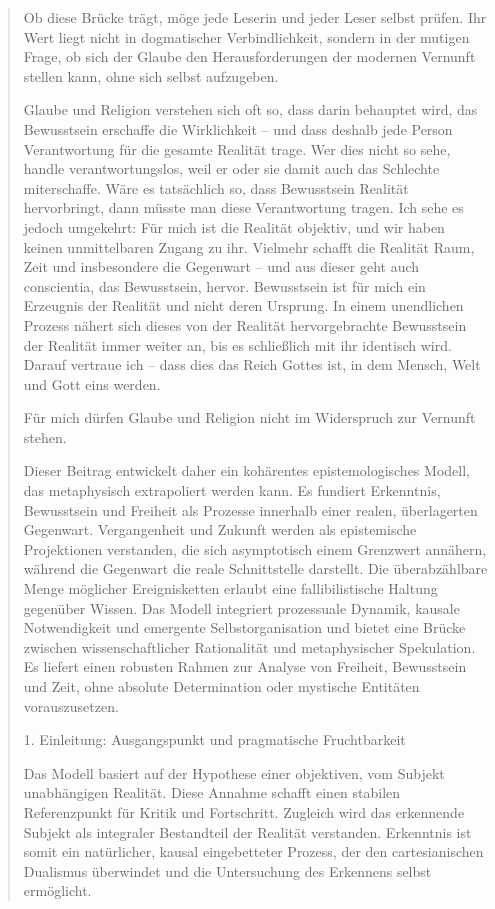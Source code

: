 \documentclass[
  ngerman,
]{article}
\begin{document}
\begin{quote}
Ob diese Brücke trägt, möge jede Leserin und jeder Leser selbst prüfen.
Ihr Wert liegt nicht in dogmatischer Verbindlichkeit, sondern in der
mutigen Frage, ob sich der Glaube den Herausforderungen der modernen
Vernunft stellen kann, ohne sich selbst aufzugeben.

Glaube und Religion verstehen sich oft so, dass darin behauptet wird,
das Bewusstsein erschaffe die Wirklichkeit -- und dass deshalb jede
Person Verantwortung für die gesamte Realität trage. Wer dies nicht so
sehe, handle verantwortungslos, weil er oder sie damit auch das
Schlechte miterschaffe. Wäre es tatsächlich so, dass Bewusstsein
Realität hervorbringt, dann müsste man diese Verantwortung tragen. Ich
sehe es jedoch umgekehrt: Für mich ist die Realität objektiv, und wir
haben keinen unmittelbaren Zugang zu ihr. Vielmehr schafft die Realität
Raum, Zeit und insbesondere die Gegenwart -- und aus dieser geht auch
conscientia, das Bewusstsein, hervor. Bewusstsein ist für mich ein
Erzeugnis der Realität und nicht deren Ursprung. In einem unendlichen
Prozess nähert sich dieses von der Realität hervorgebrachte Bewusstsein
der Realität immer weiter an, bis es schließlich mit ihr identisch wird.
Darauf vertraue ich -- dass dies das Reich Gottes ist, in dem Mensch,
Welt und Gott eins werden.

Für mich dürfen Glaube und Religion nicht im Widerspruch zur Vernunft
stehen.

Dieser Beitrag entwickelt daher ein kohärentes epistemologisches Modell,
das metaphysisch extrapoliert werden kann. Es fundiert Erkenntnis,
Bewusstsein und Freiheit als Prozesse innerhalb einer realen,
überlagerten Gegenwart. Vergangenheit und Zukunft werden als
epistemische Projektionen verstanden, die sich asymptotisch einem
Grenzwert annähern, während die Gegenwart die reale Schnittstelle
darstellt. Die überabzählbare Menge möglicher Ereignisketten erlaubt
eine fallibilistische Haltung gegenüber Wissen. Das Modell integriert
prozessuale Dynamik, kausale Notwendigkeit und emergente
Selbstorganisation und bietet eine Brücke zwischen wissenschaftlicher
Rationalität und metaphysischer Spekulation. Es liefert einen robusten
Rahmen zur Analyse von Freiheit, Bewusstsein und Zeit, ohne absolute
Determination oder mystische Entitäten vorauszusetzen.

1. Einleitung: Ausgangspunkt und pragmatische Fruchtbarkeit

Das Modell basiert auf der Hypothese einer objektiven, vom Subjekt
unabhängigen Realität. Diese Annahme schafft einen stabilen
Referenzpunkt für Kritik und Fortschritt. Zugleich wird das erkennende
Subjekt als integraler Bestandteil der Realität verstanden. Erkenntnis
ist somit ein natürlicher, kausal eingebetteter Prozess, der den
cartesianischen Dualismus überwindet und die Untersuchung des Erkennens
selbst ermöglicht.


\end{quote}
\end{document}
